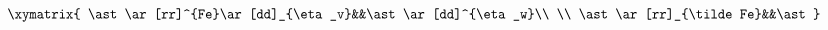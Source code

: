 \begin{equation}
\label{eq_natlgt}
\begin{aligned}
\xymatrix{
  \ast\ar[rr]^{Fe}\ar[dd]_{\eta_v}&&\ast\ar[dd]^{\eta_w}\\
  \\
  \ast\ar[rr]_{\tilde Fe}&&\ast
}
\end{aligned}
\end{equation}

